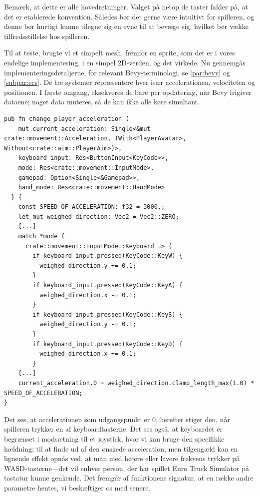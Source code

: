 Bemærk, at dette er alle hovedretninger. Valget på netop de taster falder på, at det er etablerede konvention. Således bør det gerne være intuitivt for spilleren, og denne bør hurtigt kunne tilegne sig en evne til at bevæge sig, hvilket bør vække tilfredsstillelse hos spilleren.

Til at teste, brugte vi et simpelt mesh, fremfor en sprite, som det er i vores endelige implementering, i en simpel 2D-verden, og det virkede. Nu gennemgås implementeringsdetaljerne, for relevant Bevy-terminologi, se \autoref{par:bevy} og \autoref{subpar:ecs}. De tre systemer repræsentere hver især accelerationen, velociteten og positionen. I første omgang, eksekveres de bare per opdatering, når Bevy frigiver dataene; noget data muteres, så de kan ikke alle køre simultant.

\begin{verbatim}
pub fn change_player_acceleration (
    mut current_acceleration: Single<&mut crate::movement::Acceleration, (With<PlayerAvatar>, Without<crate::aim::PlayerAim>)>,
    keyboard_input: Res<ButtonInput<KeyCode>>,
    mode: Res<crate::movement::InputMode>,
    gamepad: Option<Single<&Gamepad>>,
    hand_mode: Res<crate::movement::HandMode>
  } {
    const SPEED_OF_ACCELERATION: f32 = 3000.;
    let mut weighed_direction: Vec2 = Vec2::ZERO;
    [...]
    match *mode {
      crate::movement::InputMode::Keyboard => {
        if keyboard_input.pressed(KeyCode::KeyW) {
          weighed_direction.y += 0.1;
        }
        if keyboard_input.pressed(KeyCode::KeyA) {
          weighed_direction.x -= 0.1;
        }
        if keyboard_input.pressed(KeyCode::KeyS) {
          weighed_direction.y -= 0.1;
        }
        if keyboard_input.pressed(KeyCode::KeyD) {
          weighed_direction.x += 0.1;
        }
    [...]
    current_acceleration.0 = weighed_direction.clamp_length_max(1.0) * SPEED_OF_ACCELERATION;
}
\end{verbatim}

Det ses, at accelerationen som udgangspunkt er 0, herefter stiger den, når spilleren trykker en af keyboardtasterne. Det ses også, at keyboardet er begrænset i modsætning til et joystick, hvor vi kan bruge den specifikke hældning; til at finde ud af den ønskede acceleration, men tilgengæld kan en lignende effekt opnås ved, at man med højere eller lavere frekvens trykker på WASD-tasterne---det vil enhver person, der har spillet Euro Truck Simulator på tastatur kunne genkende. Det fremgår af funktionens signatur, at en række andre parametre hentes, vi beskæftiger os med senere.

